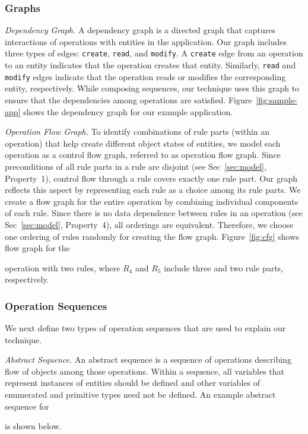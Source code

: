 \subsubsection{Graphs}

\textit{Dependency Graph.} A dependency graph is a directed graph that
captures interactions of operations with entities in the application.
Our graph includes three types of edges: {\tt create}, {\tt read}, and {\tt modify}.
A {\tt create} edge from an operation to an entity indicates that the operation
creates that entity. Similarly, {\tt read} and {\tt modify} edges indicate that
the operation reads or modifies the corresponding entity, respectively.
While composing sequences, our technique uses this graph
to ensure that the dependencies among operations are satisfied.
Figure~\ref{fig:sample-app} shows the dependency graph for our example application.

\textit{Operation Flow Graph.} To identify combinations of rule parts (within an operation)
that help create different object states of entities, we model each operation as a control
flow graph, referred to as operation flow graph. Since preconditions of all rule parts in
a rule are disjoint (see Sec~\ref{sec:model}, Property~1), control flow through a rule covers
exactly one rule part. Our graph reflects this aspect by
representing each rule as a choice among its rule parts. We create a flow graph for the entire
operation by combining individual components of each rule. 
Since there is no data dependence between rules in an operation (see Sec~\ref{sec:model}, Property~4),
all orderings are equivalent. Therefore, we choose one ordering
of rules randomly for creating the flow graph. Figure~\ref{fig:cfg} shows flow graph for 
the \subject{GenerateInvoice} operation with two rules, where $R_4$
and $R_5$ include three and two rule parts, respectively.

\subsubsection{Operation Sequences}
We next define two types of operation sequences that are used to explain
our technique.

\textit{Abstract Sequence.} An abstract sequence is a sequence of operations describing
flow of objects among those operations. Within a sequence, all variables
that represent instances of entities should be defined 
and other variables of enumerated and primitive types need not be
defined. An example abstract sequence for \subject{GenerateInvoice} is shown below.

